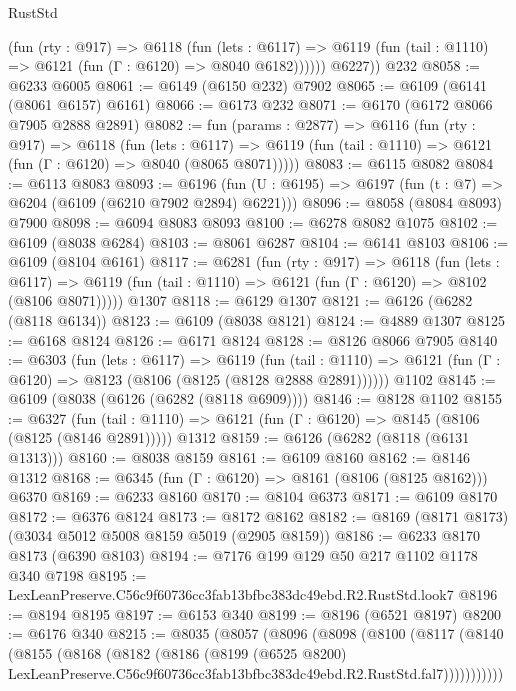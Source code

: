 \begin{lexlean}{RustStd}
\begin{coremodule}
            (fun (rty : @917) =>
            @6118
              (fun (lets : @6117) =>
              @6119 (fun (tail : @1110) => @6121 (fun (Γ : @6120) => @8040 @6182))))))
        @6227))
    @232
@8058 := @6233 @6005
@8061 := @6149 (@6150 @232) @7902
@8065 := @6109 (@6141 (@8061 @6157) @6161)
@8066 := @6173 @232
@8071 := @6170 (@6172 @8066 @7905 @2888 @2891)
@8082 := fun (params : @2877) =>
  @6116
    (fun (rty : @917) =>
    @6118
      (fun (lets : @6117) =>
      @6119 (fun (tail : @1110) => @6121 (fun (Γ : @6120) => @8040 (@8065 @8071)))))
@8083 := @6115 @8082
@8084 := @6113 @8083
@8093 := @6196 (fun (U : @6195) => @6197 (fun (t : @7) => @6204 (@6109 (@6210 @7902 @2894) @6221)))
@8096 := @8058 (@8084 @8093) @7900
@8098 := @6094 @8083 @8093
@8100 := @6278 @8082 @1075
@8102 := @6109 (@8038 @6284)
@8103 := @8061 @6287
@8104 := @6141 @8103
@8106 := @6109 (@8104 @6161)
@8117 := @6281
    (fun (rty : @917) =>
    @6118
      (fun (lets : @6117) =>
      @6119 (fun (tail : @1110) => @6121 (fun (Γ : @6120) => @8102 (@8106 @8071)))))
    @1307
@8118 := @6129 @1307
@8121 := @6126 (@6282 (@8118 @6134))
@8123 := @6109 (@8038 @8121)
@8124 := @4889 @1307
@8125 := @6168 @8124
@8126 := @6171 @8124
@8128 := @8126 @8066 @7905
@8140 := @6303
    (fun (lets : @6117) =>
    @6119
      (fun (tail : @1110) => @6121 (fun (Γ : @6120) => @8123 (@8106 (@8125 (@8128 @2888 @2891))))))
    @1102
@8145 := @6109 (@8038 (@6126 (@6282 (@8118 @6909))))
@8146 := @8128 @1102
@8155 := @6327
    (fun (tail : @1110) => @6121 (fun (Γ : @6120) => @8145 (@8106 (@8125 (@8146 @2891)))))
    @1312
@8159 := @6126 (@6282 (@8118 (@6131 @1313)))
@8160 := @8038 @8159
@8161 := @6109 @8160
@8162 := @8146 @1312
@8168 := @6345 (fun (Γ : @6120) => @8161 (@8106 (@8125 @8162))) @6370
@8169 := @6233 @8160
@8170 := @8104 @6373
@8171 := @6109 @8170
@8172 := @6376 @8124
@8173 := @8172 @8162
@8182 := @8169 (@8171 @8173) (@3034 @5012 @5008 @8159 @5019 (@2905 @8159))
@8186 := @6233 @8170 @8173 (@6390 @8103)
@8194 := @7176 @199 @129 @50 @217 @1102 @1178 @340 @7198
@8195 := LexLeanPreserve.C56c9f60736cc3fab13bfbc383dc49ebd.R2.RustStd.look7
@8196 := @8194 @8195
@8197 := @6153 @340
@8199 := @8196 (@6521 @8197)
@8200 := @6176 @340
@8215 := @8035
    (@8057
      (@8096
        (@8098
          (@8100
            (@8117
              (@8140
                (@8155
                  (@8168
                    (@8182
                      (@8186
                        (@8199
                          (@6525 @8200)
                          LexLeanPreserve.C56c9f60736cc3fab13bfbc383dc49ebd.R2.RustStd.fal7)))))))))))

\end{coremodule}
\end{lexlean}
